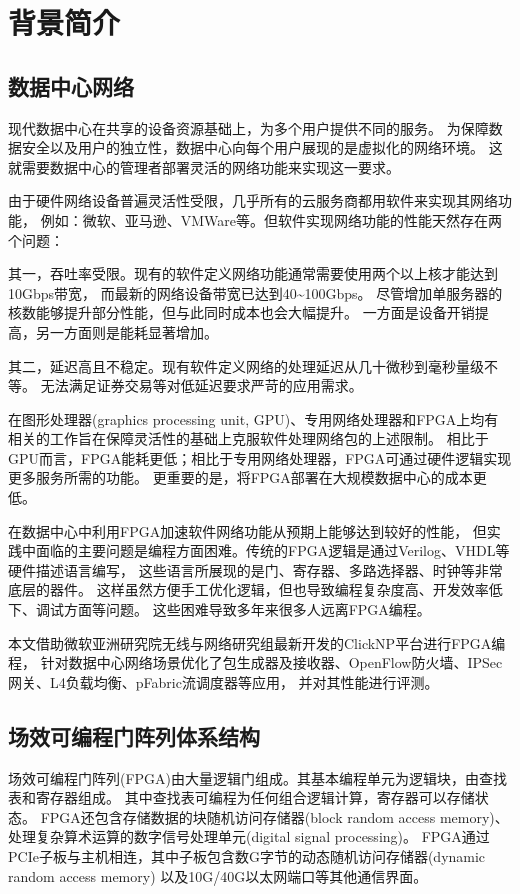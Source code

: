 \chapter{背景简介}
\section{数据中心网络}
现代数据中心在共享的设备资源基础上，为多个用户提供不同的服务。
为保障数据安全以及用户的独立性，数据中心向每个用户展现的是虚拟化的网络环境。
这就需要数据中心的管理者部署灵活的网络功能来实现这一要求。

由于硬件网络设备普遍灵活性受限，几乎所有的云服务商都用软件来实现其网络功能，
例如：微软、亚马逊、VMWare等。但软件实现网络功能的性能天然存在两个问题：

其一，吞吐率受限。现有的软件定义网络功能通常需要使用两个以上核才能达到10Gbps带宽，
而最新的网络设备带宽已达到40\textasciitilde 100Gbps。
尽管增加单服务器的核数能够提升部分性能，但与此同时成本也会大幅提升。
一方面是设备开销提高，另一方面则是能耗显著增加。

其二，延迟高且不稳定。现有软件定义网络的处理延迟从几十微秒到毫秒量级不等。
无法满足证券交易等对低延迟要求严苛的应用需求。

在图形处理器(graphics processing unit, GPU)、专用网络处理器和FPGA上均有相关的工作旨在保障灵活性的基础上克服软件处理网络包的上述限制。
相比于GPU而言，FPGA能耗更低；相比于专用网络处理器，FPGA可通过硬件逻辑实现更多服务所需的功能。
更重要的是，将FPGA部署在大规模数据中心的成本更低。

在数据中心中利用FPGA加速软件网络功能从预期上能够达到较好的性能，
但实践中面临的主要问题是编程方面困难。传统的FPGA逻辑是通过Verilog、VHDL等硬件描述语言编写，
这些语言所展现的是门、寄存器、多路选择器、时钟等非常底层的器件。
这样虽然方便手工优化逻辑，但也导致编程复杂度高、开发效率低下、调试方面等问题。
这些困难导致多年来很多人远离FPGA编程。

本文借助微软亚洲研究院无线与网络研究组最新开发的ClickNP平台进行FPGA编程，
针对数据中心网络场景优化了包生成器及接收器、OpenFlow防火墙、IPSec网关、L4负载均衡、pFabric流调度器等应用，
并对其性能进行评测。

\section{场效可编程门阵列体系结构}
场效可编程门阵列(FPGA)由大量逻辑门组成。其基本编程单元为逻辑块，由查找表和寄存器组成。
其中查找表可编程为任何组合逻辑计算，寄存器可以存储状态。
FPGA还包含存储数据的块随机访问存储器(block random access memory)、
处理复杂算术运算的数字信号处理单元(digital signal processing)。
FPGA通过PCIe子板与主机相连，其中子板包含数G字节的动态随机访问存储器(dynamic random access memory)
以及10G/40G以太网端口等其他通信界面。

